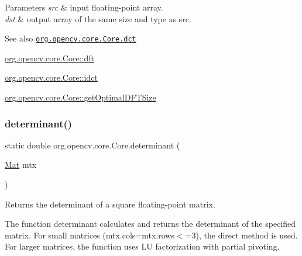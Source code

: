 {\ttfamily }

{\ttfamily }

{\ttfamily }


\begin{DoxyParams}{Parameters}
{\em src} & input floating-\/point array. \\
\hline
{\em dst} & output array of the same size and type as {\ttfamily src}.\\
\hline
\end{DoxyParams}
\begin{DoxySeeAlso}{See also}
\href{http://docs.opencv.org/modules/core/doc/operations_on_arrays.html#dct}{\tt org.\+opencv.\+core.\+Core.\+dct} 

\mbox{\hyperlink{classorg_1_1opencv_1_1core_1_1_core_a43313221157a3008972a04727a65a58d}{org.\+opencv.\+core.\+Core\+::dft}} 

\mbox{\hyperlink{classorg_1_1opencv_1_1core_1_1_core_a64eb690877f2d4ac16c1b1c3375c0b7b}{org.\+opencv.\+core.\+Core\+::idct}} 

\mbox{\hyperlink{classorg_1_1opencv_1_1core_1_1_core_a9818ffe89dca479da8352d5bf6ebd6b3}{org.\+opencv.\+core.\+Core\+::get\+Optimal\+D\+F\+T\+Size}} 
\end{DoxySeeAlso}
\mbox{\label{classorg_1_1opencv_1_1core_1_1_core_a9108dd80dbec1fd4f196a6e9e2564734}} 
\subsubsection{\texorpdfstring{determinant()}{determinant()}}
{\footnotesize\ttfamily static double org.\+opencv.\+core.\+Core.\+determinant (\begin{DoxyParamCaption}\item[{\mbox{\hyperlink{classorg_1_1opencv_1_1core_1_1_mat}{Mat}}}]{mtx }\end{DoxyParamCaption})\hspace{0.3cm}{\ttfamily [static]}}

Returns the determinant of a square floating-\/point matrix.

The function {\ttfamily determinant} calculates and returns the determinant of the specified matrix. For small matrices ({\ttfamily mtx.\+cols=mtx.\+rows$<$=3}), the direct method is used. For larger matrices, the function uses LU factorization with partial pivoting.

